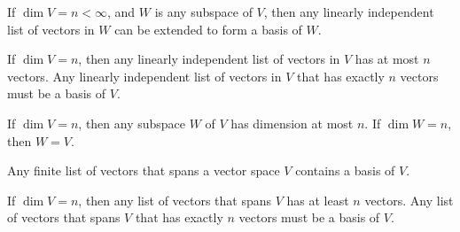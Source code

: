 \endedxproblem


\endedxvertical










{}  If $\dim V = n < \infty$, and $W$ is any subspace of $V$, then any
linearly independent list of vectors in $W$ can be extended to form a basis of $W$.  

{} If $\dim V = n$, then any linearly independent list of vectors in $V$ has
at most $n$ vectors.  Any linearly independent list of vectors in $V$ that has exactly $n$ vectors must
be a basis of $V$.  


{} If $\dim V = n$, then any subspace $W$ of $V$ has dimension at most $n$.  
If $\dim W = n$, then $W = V$.  


{} Any finite list of vectors that spans a vector space $V$ contains a basis of $V$.  

{} If $\dim V = n$, then any list of vectors that spans $V$ has
at least $n$ vectors.  Any  list of vectors that spans $V$ that has exactly $n$ vectors must
be a basis of $V$.  


